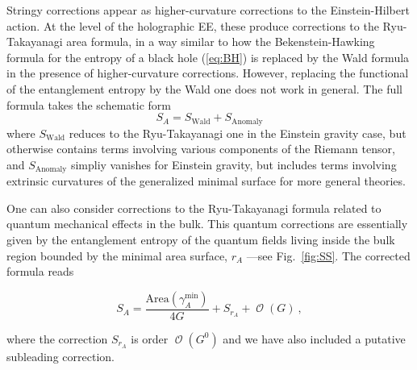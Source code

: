 \documentclass[twocolumn]{revtex4}
\providecommand{\eq}[2]{
    \begin{equation}
        #2
    \label{eq:#1}
    \end{equation}
}
\DeclareMathOperator{\calO}{\mathcal{O}}
\begin{document}
Stringy corrections appear as higher-curvature corrections to the Einstein-Hilbert action. At the level of the holographic EE, these produce corrections to the Ryu-Takayanagi area formula, in a way similar to 
how the Bekenstein-Hawking formula for the entropy of a black hole (\ref{eq:BH}) is replaced by the Wald formula \cite{iyer_properties_1994} in the presence of higher-curvature corrections. However, replacing the functional of the entanglement entropy by the Wald one does not work in general. The full formula takes the schematic form \cite{dong_holographic_2014}
\begin{equation}\label{hee}
    S_A=S_{\text{Wald}}+ S_{\text{Anomaly}}
\end{equation}
where $S_{\text{Wald}}$ reduces to the Ryu-Takayanagi one in the Einstein gravity case, but otherwise contains terms involving various components of the Riemann tensor, and $S_{\text{Anomaly}}$ simpliy vanishes for Einstein gravity, but includes terms involving extrinsic curvatures of the generalized minimal surface for more general theories. %



One can also consider corrections to the Ryu-Takayanagi formula related to quantum mechanical effects in the bulk. This quantum corrections are essentially given by the entanglement entropy of the quantum fields living inside the bulk region bounded by the minimal area surface, $r_A$ ---see Fig.~\ref{fig:SS}. The corrected formula reads \cite{faulkner_quantum_2013}
\eq{EEquantum}{
    S_A = \frac{\text{Area} (\gamma_A^\text{min})}{4 G} + S_{r_A} + \calO(G) \ ,
}
where the correction $S_{r_A}$ is order $\calO(G^0)$ and we have also included a putative subleading correction.
\end{document}
